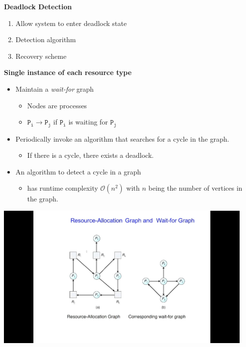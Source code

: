 \documentclass[11pt,a4paper]{article}
\begin{document}
\textbf{Deadlock Detection}
\begin{enumerate}
    \item Allow system to enter deadlock state
    \item Detection algorithm
    \item Recovery scheme
\end{enumerate}

\textbf{Single instance of each resource type}
\begin{itemize}
    \item Maintain a \emph{wait-for} graph
        \begin{itemize}
            \item Nodes are processes
            \item $\texttt{P}_\texttt{i} \to \texttt{P}_\texttt{j}$ if $\texttt{P}_\texttt{i}$
                is waiting for $\texttt{P}_\texttt{j}$
        \end{itemize}
    \item Periodically invoke an algorithm that searches for a cycle in the graph.
        \begin{itemize}
            \item If there is a cycle, there exists a deadlock.
        \end{itemize}
    \item An algorithm to detect a cycle in a graph
        \begin{itemize}
            \item has runtime complexity $\mathcal{O}(n^2)$ with $n$ being the number of
                vertices in the graph.
        \end{itemize}
\end{itemize}

\includegraphics[height=270]{resource-allocation-graph-and-wait-for-graph.jpg}
\end{document}
